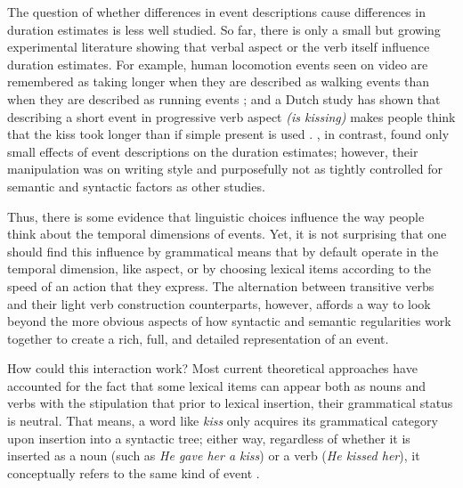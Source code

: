 \documentclass[preprint,12pt,authoryear]{elsarticle}
\begin{document}
The question of whether differences in event descriptions cause differences in duration estimates is less well studied. So far, there is only a small but growing experimental literature showing that verbal aspect or the verb itself influence duration estimates. For example, human locomotion events seen on video are remembered as taking longer when they are described as walking events than when they are described as running events \citep{burt1996effects}; and a Dutch study has shown that describing a short event in progressive verb aspect \emph{(is kissing)} makes people think that the kiss took longer than if simple present is used \citep{flecken2013grammatical}. \citet{pedersen2002differences}, in contrast, found only small effects of event descriptions on the duration estimates; however, their manipulation was on writing style and purposefully not as tightly controlled for semantic and syntactic factors as other studies. 

Thus, there is some evidence that linguistic choices influence the way people think about the temporal dimensions of events. Yet, it is not surprising that one should find this influence by grammatical means that by default operate in the temporal dimension, like aspect, or by choosing lexical items according to the speed of an action that they express. The alternation between transitive verbs and their light verb construction counterparts, however, affords a way to look beyond the more obvious aspects of how syntactic and semantic regularities work together to create a rich, full, and detailed representation of an event.

How could this interaction work? Most current theoretical approaches have accounted for the fact that some lexical items can appear both as nouns and verbs with the stipulation that prior to lexical insertion, their grammatical status is neutral. That means, a word like \emph{kiss} only acquires its grammatical category upon insertion into a syntactic tree; either way, regardless of whether it is inserted as a noun (such as \emph{He gave her a kiss}) or a verb (\emph{He kissed her}), it conceptually refers to the same kind of event \citep{halle1994some,barner2002no}. 
\end{document}
